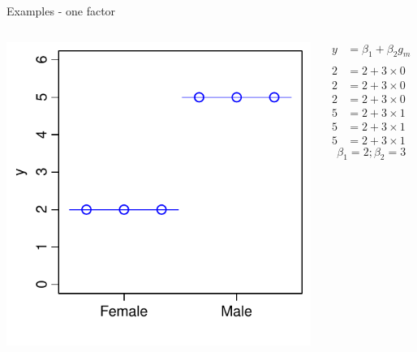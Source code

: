\documentclass[xcolor=x11names,compress]{beamer}
\renewcommand{\(}{\begin{columns}}
\renewcommand{\)}{\end{columns}}
\newcommand{\<}[1]{\begin{column}{#1}}
\renewcommand{\>}{\end{column}}
\begin{document}
\begin{frame}{Examples - one factor}

    \begin{columns}[T]
    
            \includegraphics[width=\textwidth]{Factor.pdf}
            
            \begin{align*}
              y  &= \beta_1 + \beta_2 g_m  \\
              \\
              2  &= 2 + 3 \times 0 \\
              2  &= 2 + 3 \times 0 \\
              2  &= 2 + 3 \times 0 \\
              5  &= 2 + 3 \times 1 \\  
              5  &= 2 + 3 \times 1 \\
              5  &= 2 + 3 \times 1
            \end{align*}
            \[\beta_1 = 2; \beta_2=3\]
    \end{columns}
\end{frame}
    
\end{document}
